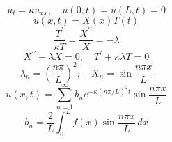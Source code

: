 \documentclass{article}
\begin{document}
\[
u_t=\kappa u_{xx},\quad u(0,t)=u(L,t)=0
\]
\[
u(x,t)=X(x)T(t)
\]
\[
\frac{T^{\prime}}{\kappa T}=\frac{X^{\prime\prime}}{X}=-\lambda
\]
\[
X^{\prime\prime}+\lambda X=0,\quad T^{\prime}+\kappa\lambda T=0
\]
\[
\lambda_n=\left(\frac{n\pi}{L}\right)^2,\quad X_n=\sin\frac{n\pi x}{L}
\]
\[
u(x,t)=\sum_{n=1}^{\infty}b_n e^{-\kappa(n\pi/L)^2t}\sin\frac{n\pi x}{L}
\]
\[
b_n=\frac{2}{L}\int_0^L f(x)\sin\frac{n\pi x}{L}\,dx
\]
\end{document}

